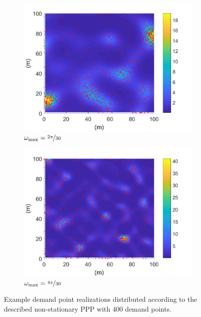 \documentclass[12pt,dvipsnames]{report}
\begin{document}
\begin{figure}[ht]
	\centering
	\begin{subfigure}{.49\textwidth}
		\centering
		\includegraphics[width=1\linewidth]{lambda_nsPPP-400_O2pi-300_L100000_X100_Y100}
		\caption{\small $\omega_{\max}=\nicefrac{2 \pi}{30}$}
		\label{fig:lambda_nsPPP_2pi-300}
	\end{subfigure} \hfill
	\begin{subfigure}{.49\textwidth}
		\centering
		\includegraphics[width=1\linewidth]{lambda_nsPPP-400_O4pi-300_L100000_X100_Y100}
		\caption{\small $\omega_{\max}=\nicefrac{4 \pi}{30}$}
		\label{fig:lambda_nsPPP_4pi-300}
	\end{subfigure}
	\caption[Realizations of example SSLT demand point distributions]{\small Example demand point realizations distributed according to the described non-stationary PPP with 400 demand points.}
	\label{fig:lambda_nsPPP}
\end{figure}
\end{document}
